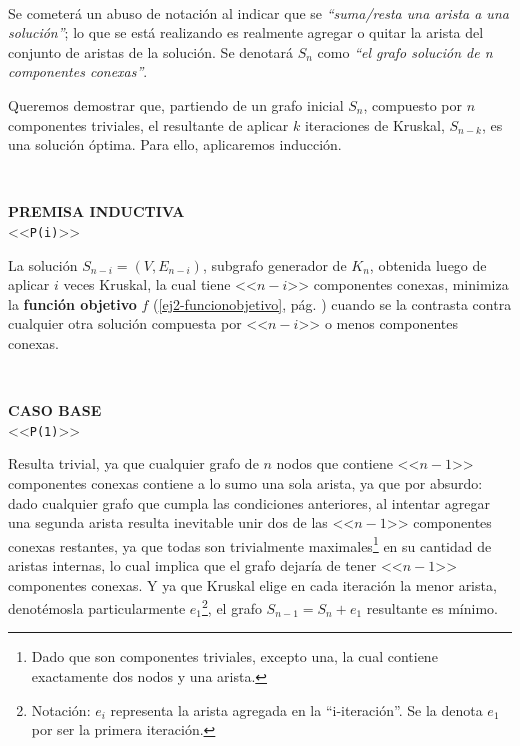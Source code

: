 \documentclass[11pt, a4paper, twoside]{article}
\begin{document}
\begin{paragraph}\


\begin{aclaracion}

Se cometerá un abuso de notación al indicar que se \emph{``suma/resta una
arista a una solución''}; lo que se está realizando es realmente agregar o
quitar la arista del conjunto de aristas de la solución. Se denotará $S_{n}$
como \emph{``el grafo solución de n componentes conexas''}.

\end{aclaracion}

Queremos demostrar que, partiendo de un grafo inicial $S_{n}$, compuesto por
$n$ componentes triviales, el resultante de aplicar $k$ iteraciones de
Kruskal, $S_{n-k}$, es una solución óptima. Para ello, aplicaremos inducción.

\end{paragraph}

\begin{paragraph}\
%
%
\begin{center}
\textbf{PREMISA INDUCTIVA}\\
<<\texttt{P(i)}>>
\end{center}

La solución $S_{n-i}=(V,E_{n-i})$, subgrafo generador de $K_n$, obtenida luego
de aplicar $i$ veces Kruskal, la cual tiene <<$n-i$>> componentes conexas,
minimiza la \textbf{función objetivo} $f$ (\ref{ej2-funcionobjetivo}, pág.
\pageref{ej2-funcionobjetivo}) cuando se la contrasta contra cualquier otra
solución compuesta por <<$n-i$>> o menos componentes conexas.

\end{paragraph}

\begin{paragraph}\
%
%
\begin{center}
\textbf{CASO BASE}\\
<<\texttt{P(1)}>>
\end{center}

Resulta trivial, ya que cualquier grafo de $n$ nodos que contiene <<$n-1$>>
componentes conexas contiene a lo sumo una sola arista, ya que por absurdo:
dado cualquier grafo que cumpla las condiciones anteriores, al intentar
agregar una segunda arista resulta inevitable unir dos de las <<$n-1$>>
componentes conexas restantes, ya que todas son trivialmente
maximales\footnote{Dado que son componentes triviales, excepto una, la cual
contiene exactamente dos nodos y una arista.} en su cantidad de aristas internas, 
lo cual implica que el grafo
dejaría de tener <<$n-1$>> componentes conexas. Y ya que Kruskal elige en cada
iteración la menor arista, denotémosla particularmente
$e_{1}$\footnote{Notación: $e_{i}$ representa la arista agregada en la
``i-iteración''. Se la denota $e_{1}$ por ser la primera iteración.}, el grafo
$S_{n-1} = S_{n} + e_{1}$ resultante es mínimo.

\end{paragraph}
\end{document}
